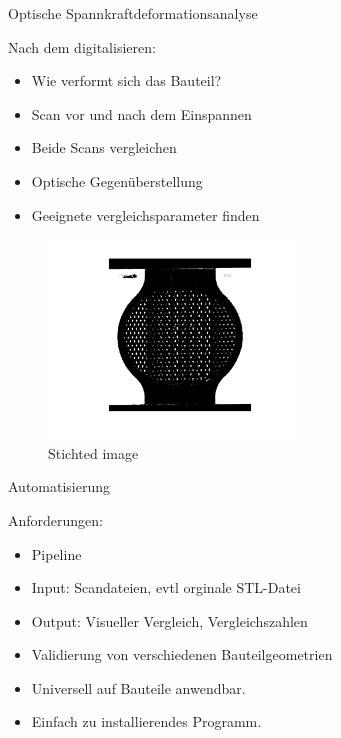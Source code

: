 \documentclass[../slides.tex]{subfiles}
\begin{document}
\begin{frame}{Optische Spannkraftdeformationsanalyse}
    \begin{minipage}[h]{.39\textwidth}
        \begin{block}{Nach dem digitalisieren:}
            \begin{itemize}
                \item Wie verformt sich das Bauteil?
                \item Scan vor und nach dem Einspannen
                \item Beide Scans vergleichen
                \item Optische Gegenüberstellung
                \item Geeignete vergleichsparameter finden
            \end{itemize}
        \end{block}
    \end{minipage}
    \hfill
    \begin{minipage}[h]{.6\textwidth}
      \begin{figure}[]
        \includegraphics[height=150pt]{img_niklas/stichted.png}
        \caption[short]{Stichted image}
      \end{figure}
    \end{minipage}
  \end{frame}

  \begin{frame}{Automatisierung}
    \begin{minipage}[h]{.6\textwidth}
        \begin{block}{Anforderungen:}
            \begin{itemize}
                \item Pipeline
                \item Input: Scandateien, evtl orginale STL-Datei
                \item Output: Visueller Vergleich, Vergleichszahlen
                \item Validierung von verschiedenen Bauteilgeometrien 
                \item Universell auf Bauteile anwendbar.
                \item Einfach zu installierendes Programm.
            \end{itemize}
        \end{block}
    \end{minipage}
    \hfill
    \begin{minipage}[h]{.39\textwidth}
      
    \end{minipage}
  \end{frame}
\end{document}
